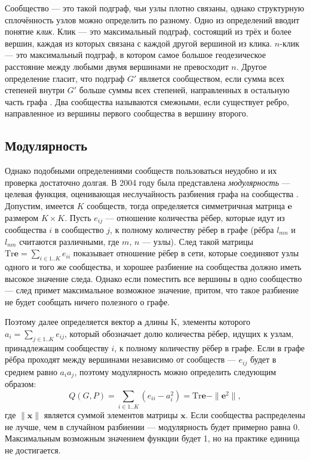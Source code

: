 Сообщество --- это такой подграф, чьи узлы плотно связаны, однако структурную сплочённость узлов можно определить по разному. Одно из определений вводит понятие \emph{клик}. Клик --- это максимальный подграф, состоящий из трёх и более вершин, каждая из которых связана с каждой другой вершиной из клика. $n$-клик --- это максимальный подграф, в котором самое большое геодезическое расстояние между любыми двумя вершинами не превосходит $n$. Другое определение гласит, что подграф $G'$ является сообществом, если сумма всех степеней внутри $G'$ больше суммы всех степеней, направленных в остальную часть графа \cite{Wasserman:1994}. Два сообщества называются смежными, если существует ребро, направленное из вершины первого сообщества в вершину второго.



\subsection{Модулярность}
\label{subsec:modularity}

Однако подобными определениями сообществ пользоваться неудобно и их проверка достаточно долгая. В 2004 году была представлена \emph{модулярность} --- целевая функция, оценивающая неслучайность разбиения графа на сообщества \cite{Newman&Girvan:2004}. Допустим, имеется $K$ сообществ, тогда определяется симметричная матрица $\mathbf{e}$ размером $K \times K$. Пусть $e_{ij}$ --- отношение количества рёбер, которые идут из сообщества $i$ в сообщество $j$, к полному количеству рёбер в графе (рёбра $l_{mn}$ и $l_{nm}$ считаются различными, где $m$, $n$ --- узлы). След такой матрицы $\mathrm{Tr} \mathbf{e} = \sum_{i \in 1..K}{e_{ii}}$ показывает отношение рёбер в сети, которые соединяют узлы одного и того же сообщества, и хорошее разбиение на сообщества должно иметь высокое значение следа. Однако если поместить все вершины в одно сообщество --- след примет максимальное возможное значение, притом, что такое разбиение не будет сообщать ничего полезного о графе.

Поэтому далее определяется вектор $\mathbf{a}$ длины K, элементы которого $a_i = \sum_{j \in 1..K}{e_{ij}}$, который обозначает долю количества рёбер, идущих к узлам, принадлежащим сообществу $i$, к полному количеству рёбер в графе. Если в графе рёбра проходят между вершинами независимо от сообществ --- $e_{ij}$ будет в среднем равно $a_i a_j$, поэтому модулярность можно определить следующим образом:
\begin{equation} \label{eq:q1}
Q(G, P) = \sum_{i \in 1..K}{\left(e_{ii} - a_i^2\right)} = \mathrm{Tr} \mathbf{e} - \|\mathbf{e}^2\|,
\end{equation}
где $\|\mathbf{x}\|$ является суммой элементов матрицы $\mathbf{x}$. Если сообщества распределены не лучше, чем в случайном разбиении --- модулярность будет примерно равна 0. Максимальным возможным значением функции будет 1, но на практике единица не достигается.

